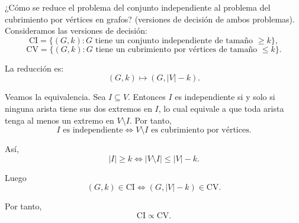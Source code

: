\documentclass[12pt]{article}
\begin{document}
    \begin{ejercicio}[1.5 puntos]
        ¿Cómo se reduce el problema del conjunto independiente al problema del cubrimiento por vértices en grafos? 
        (versiones de decisión de ambos problemas). \\

        Consideramos las versiones de decisión:
        $$
        \text{CI}=\{(G,k): G \text{ tiene un conjunto independiente de tamaño } \geq k\},
        $$
        $$
        \text{CV}=\{(G,k): G \text{ tiene un cubrimiento por vértices de tamaño } \leq k\}.
        $$

        La reducción es:
        $$
        (G,k)\longmapsto (G, |V|-k).
        $$

        Veamos la equivalencia. Sea $I\subseteq V$. Entonces $I$ es independiente si y solo si ninguna arista tiene sus dos extremos en $I$, lo cual equivale a que toda arista tenga al menos un extremo en $V\setminus I$. Por tanto,
        $$
        I \text{ es independiente}
        \Longleftrightarrow
        V\setminus I \text{ es cubrimiento por vértices}.
        $$

        Así,
        $$
        |I|\geq k
        \Longleftrightarrow
        |V\setminus I|\leq |V|-k.
        $$

        Luego
        $$
        (G,k)\in \text{CI}
        \Longleftrightarrow
        (G,|V|-k)\in \text{CV}.
        $$

        Por tanto,
        $$
        \text{CI}\propto \text{CV}.
        $$
    \end{ejercicio}
\end{document}
